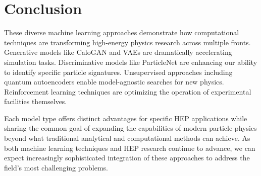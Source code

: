 \documentclass[letterpaper,12pt]{article}
\begin{document}
\section{Conclusion}
These diverse machine learning approaches demonstrate how computational techniques are transforming high-energy physics research across multiple fronts. Generative models like CaloGAN and VAEs are dramatically accelerating simulation tasks. Discriminative models like ParticleNet are enhancing our ability to identify specific particle signatures. Unsupervised approaches including quantum autoencoders enable model-agnostic searches for new physics. Reinforcement learning techniques are optimizing the operation of experimental facilities themselves.

Each model type offers distinct advantages for specific HEP applications while sharing the common goal of expanding the capabilities of modern particle physics beyond what traditional analytical and computational methods can achieve. As both machine learning techniques and HEP research continue to advance, we can expect increasingly sophisticated integration of these approaches to address the field's most challenging problems.


\end{document}
